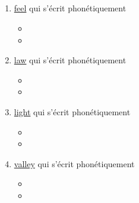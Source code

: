 \subsection{}\label{subsec:l}

\begin{enumerate}
\item \href{http://www.wordreference.com/enfr/feel}{feel} qui s'écrit phonétiquement \href{https://en.oxforddictionaries.com/definition/feel}{}
  
  \begin{itemize}
  \item{}
  \item{}
  \end{itemize}

  
\item \href{http://www.wordreference.com/enfr/law}{law} qui s'écrit phonétiquement \href{https://en.oxforddictionaries.com/definition/law}{}

  \begin{itemize}
  \item{}
  \item{}
  \end{itemize}

  
\item \href{http://www.wordreference.com/enfr/light}{light} qui s'écrit phonétiquement \href{https://en.oxforddictionaries.com/definition/light}{}

  \begin{itemize}
  \item{}
  \item{}
  \end{itemize}


\item \href{http://www.wordreference.com/enfr/valley}{valley} qui s'écrit phonétiquement \href{https://en.oxforddictionaries.com/definition/valley}{}

  \begin{itemize}
  \item{}
  \item{}
  \end{itemize}


\end{enumerate}

